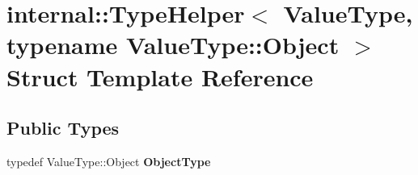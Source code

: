 \hypertarget{structinternal_1_1TypeHelper_3_01ValueType_00_01typename_01ValueType_1_1Object_01_4}{}\section{internal\+:\+:Type\+Helper$<$ Value\+Type, typename Value\+Type\+:\+:Object $>$ Struct Template Reference}
\label{structinternal_1_1TypeHelper_3_01ValueType_00_01typename_01ValueType_1_1Object_01_4}
\subsection*{Public Types}
\begin{DoxyCompactItemize}
\item 
typedef Value\+Type\+::\+Object {\bfseries Object\+Type}\hypertarget{structinternal_1_1TypeHelper_3_01ValueType_00_01typename_01ValueType_1_1Object_01_4_ac5d59bffe76792786fd5f1ba4da94dd9}{}\label{structinternal_1_1TypeHelper_3_01ValueType_00_01typename_01ValueType_1_1Object_01_4_ac5d59bffe76792786fd5f1ba4da94dd9}

\end{DoxyCompactItemize}
